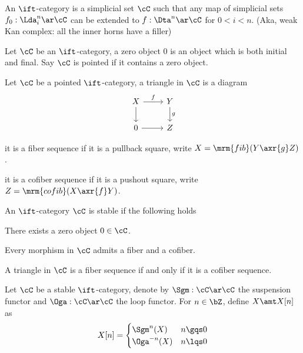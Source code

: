 \documentclass[article, a4paper, twoside]{universal}
\begin{document}
\begin{dfn}[0.0.0.1]
    An $\ift$-category is a simplicial set $\cC$ such that any map of simplicial sets $f_{0}:\Lda_{i}^{n}\ar\cC$ can be extended to $f:\Dta^{n}\ar\cC$ for $0<i<n$. (Aka, weak Kan complex: all the inner horns have a filler)
\end{dfn}

\begin{dfn}[1.1.1.1]
    Let $\cC$ be an $\ift$-category, a zero object $0$ is an object which is both initial and final. Say $\cC$ is pointed if it contains a zero object.
\end{dfn}

\begin{dfn}[1.1.1.4]
    Let $\cC$ be a pointed $\ift$-category, a triangle in $\cC$ is a diagram
    \[
        \begin{tikzcd}
            X\ar[r, "f"]\ar[d] & Y\ar[d, "g"] \\
            0 \ar[r] & Z
        \end{tikzcd}
    \]
    \begin{itm}
        \item it is a fiber sequence if it is a pullback square, write $X=\mrm{fib}(Y\axr{g}Z)$.
        \item it is a cofiber sequence if it is a pushout square, write $Z=\mrm{cofib}(X\axr{f}Y)$.
    \end{itm}
\end{dfn}

\begin{dfn}[1.1.1.9]
    An $\ift$-category $\cC$ is stable if the following holds
    \begin{enr}[label=(\arabic*)]
        \item There exists a zero object $0\in\cC$.
        \item Every morphism in $\cC$ admits a fiber and a cofiber.
        \item A triangle in $\cC$ is a fiber sequence if and only if it is a cofiber sequence.
    \end{enr}

\end{dfn}


\begin{dfn}[1.1.2.7]
    Let $\cC$ be a stable $\ift$-category, denote by $\Sgm:\cC\ar\cC$ the suspension functor and $\Oga:\cC\ar\cC$ the loop functor. For $n\in\bZ$, define $X\amt X[n]$ as
        \[
            X[n]=\begin{cases}
              \Sgm^{n}(X) & n\gqs0 \\
              \Oga^{-n}(X) & n\lqs0
            \end{cases}
        \]
\end{dfn}
\end{document}
